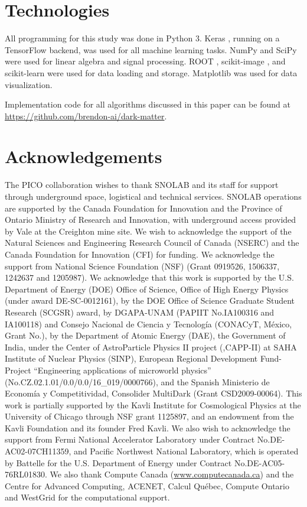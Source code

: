 \documentclass[10pt]{article}
\begin{document}
\section{Technologies}

All programming for this study was done in Python 3. Keras \cite{keras}, running on a TensorFlow \cite{tensorflow} backend, was used for all machine learning tasks. NumPy \cite{numpy} and SciPy \cite{scipy} were used for linear algebra and signal processing. ROOT \cite{root}, scikit-image \cite{scikit-image}, and scikit-learn \cite{scikit-learn} were used for data loading and storage. Matplotlib \cite{matplotlib} was used for data visualization.

Implementation code for all algorithms discussed in this paper can be found at \url{https://github.com/brendon-ai/dark-matter}.

\section{Acknowledgements}

The PICO collaboration wishes to thank SNOLAB and its staff for support through underground space, logistical and technical services. SNOLAB operations are supported by the Canada Foundation for Innovation and the Province of Ontario Ministry of Research and Innovation, with underground access provided by Vale at the Creighton mine site. We wish to acknowledge the support of the Natural Sciences and Engineering Research Council of Canada (NSERC) and the Canada Foundation for Innovation (CFI) for funding. We acknowledge the support from National Science Foundation (NSF) (Grant 0919526, 1506337, 1242637 and 1205987). We acknowledge that this work is supported by the U.S. Department of Energy (DOE) Office of Science, Office of High Energy Physics (under award DE-SC-0012161), by the DOE Office of Science Graduate Student Research (SCGSR) award,  by DGAPA-UNAM (PAPIIT No.\:IA100316 and IA100118) and Consejo Nacional de Ciencia y Tecnolog\'ia (CONACyT, M\'exico, Grant No.), by the Department of Atomic Energy (DAE), the Government of India, under the Center of AstroParticle Physics II project (,CAPP-II) at SAHA Institute of Nuclear Physics (SINP), European Regional Development Fund-Project ``Engineering applications of microworld physics'' (No.\:CZ.02.1.01/0.0/0.0/16\_019/0000766), 
and the Spanish Ministerio de Econom\'ia y Competitividad, Consolider MultiDark (Grant CSD2009-00064). This work is partially supported by the Kavli Institute for Cosmological Physics at the University of Chicago through NSF grant 1125897, and an endowment from the Kavli Foundation and its founder Fred Kavli. We also wish to acknowledge the support from Fermi National Accelerator Laboratory under Contract No.\:DE-AC02-07CH11359, and Pacific Northwest National Laboratory, which is operated by Battelle for the U.S. Department of Energy under Contract No.\:DE-AC05-76RL01830. We also thank Compute Canada (\url{www.computecanada.ca}) and the Centre for Advanced Computing, ACENET, Calcul Qu\'ebec, Compute Ontario and WestGrid for the computational support.

\printbibliography
\end{document}
